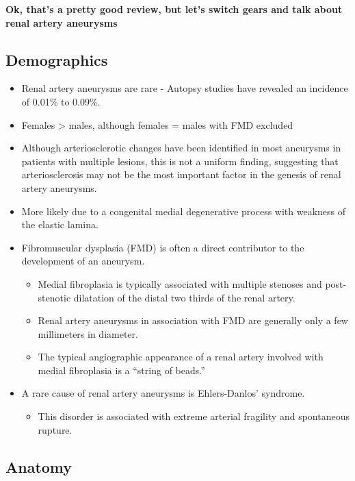 \documentclass[
]{book}
\providecommand{\tightlist}{%
  \setlength{\itemsep}{0pt}\setlength{\parskip}{0pt}}
\begin{document}
\textbf{Ok, that's a pretty good review, but let's switch gears and talk about
renal artery aneurysms}

\hypertarget{demographics-2}{%
\subsection{Demographics}\label{demographics-2}}

\begin{itemize}
\item
  Renal artery aneurysms are rare - Autopsy studies have revealed an
  incidence of 0.01\% to 0.09\%.
\item
  Females \textgreater{} males, although females = males with FMD excluded
\item
  Although arteriosclerotic changes have been identified in most
  aneurysms in patients with multiple lesions, this is not a uniform
  finding, suggesting that arteriosclerosis may not be the most
  important factor in the genesis of renal artery aneurysms.
\item
  More likely due to a congenital medial degenerative process with
  weakness of the elastic lamina.
\item
  Fibromuscular dysplasia (FMD) is often a direct contributor to the
  development of an aneurysm.

  \begin{itemize}
  \item
    Medial fibroplasia is typically associated with multiple
    stenoses and post-stenotic dilatation of the distal two thirds
    of the renal artery.
  \item
    Renal artery aneurysms in association with FMD are generally
    only a few millimeters in diameter.
  \item
    The typical angiographic appearance of a renal artery involved
    with medial fibroplasia is a ``string of beads.''
  \end{itemize}
\item
  A rare cause of renal artery aneurysms is Ehlers-Danlos' syndrome.

  \begin{itemize}
  \tightlist
  \item
    This disorder is associated with extreme arterial fragility and
    spontaneous rupture.
  \end{itemize}
\end{itemize}

\hypertarget{anatomy-1}{%
\subsection{Anatomy}\label{anatomy-1}}
\end{document}
